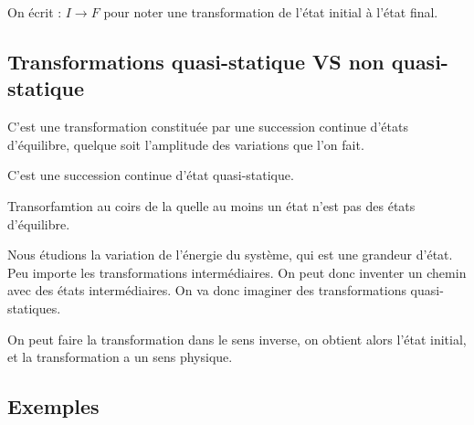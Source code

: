 \documentclass[french]{yLectureNote}
\begin{document}
On écrit : $I\to F$ pour noter une transformation de l'état initial à l'état final.
\subsection{Transformations quasi-statique VS non quasi-statique}
\begin{definition}
    C'est une transformation constituée par une succession continue d'états d'équilibre, quelque soit l'amplitude des variations que l'on fait. 
\end{definition}
C'est une succession continue d'état quasi-statique.

\begin{definition}
    Transorfamtion au coirs de la quelle au moins un état n'est pas des états d'équilibre.
\end{definition}
Nous étudions la variation de l'énergie du système, qui est une grandeur d'état. 
Peu importe les transformations intermédiaires. On peut donc inventer un chemin avec des états intermédiaires. 
On va donc imaginer des transformations quasi-statiques.

\begin{definition}
    On peut faire la transformation dans le sens inverse, on obtient alors l'état initial, et la transformation a un sens physique.
\end{definition}
\subsection{Exemples}
\end{document}
